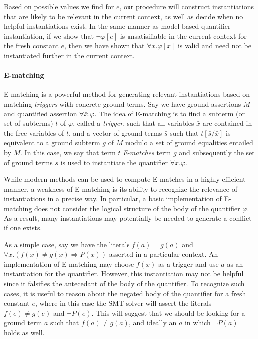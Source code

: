 \documentclass{llncs}
\begin{document}
Based on possible values we find for $e$, our procedure will construct instantiations that are likely to be relevant in the current context, as well as decide when no helpful instantiations exist.
In the same manner as model-based quantifier instantiation, if we show that $\neg \varphi[e]$ is unsatisifiable in the current context for the fresh constant $e$, then we have shown that $\forall x. \varphi[x]$ is valid and need not be instantiated further in the current context.

\paragraph{E-matching}
E-matching is a powerful method for generating relevant instantiations based on matching \emph{triggers} with concrete ground terms. 
Say we have ground assertions $M$ and quantified assertion $\forall \bar{x}. \varphi$.
The idea of E-matching is to find a subterm (or set of subterms) $t$ of $\varphi$, called a \emph{trigger}, such that all variables $\bar{x}$ are contained in the free variables of $t$, and a vector of ground terms $\bar{s}$ such that $t[\bar{s}/\bar{x}]$ is equivalent to a ground subterm $g$ of $M$ modulo a set of ground equalities entailed by $M$.
In this case, we say that term $t$ \emph{E-matches} term $g$ and subsequently the set of ground terms $\bar{s}$ is used to instantiate the quantifier $\forall \bar{x}. \varphi$.

While modern methods can be used to compute E-matches in a highly efficient manner, a weakness of E-matching is its ability to recognize the relevance of instantiations in a precise way.
In particular, a basic implementation of E-matching does not consider the logical structure of the body of the quantifier $\varphi$.
As a result, many instantiations may potentially be needed to generate a conflict if one exists.

As a simple case, say we have the literals $f( a ) = g( a )$ and $\forall x. ( f(x) \neq g(x) \Rightarrow P( x ) )$ asserted in a particular context. 
An implementation of E-matching may choose $f( x )$ as a trigger and use $a$ as an instantiation for the quantifier.
However, this instantiation may not be helpful since it falsifies the antecedant of the body of the quantifier.
To recognize such cases, it is useful to reason about the negated body of the quantifier for a fresh constant $e$, where in this case the SMT solver will assert the literals $f( e ) \neq g( e )$ and $\neg P( e )$.
This will suggest that we should be looking for a ground term $a$ such that $f( a ) \neq g( a )$, and ideally an $a$ in which $\neg P( a )$ holds as well.
\end{document}
